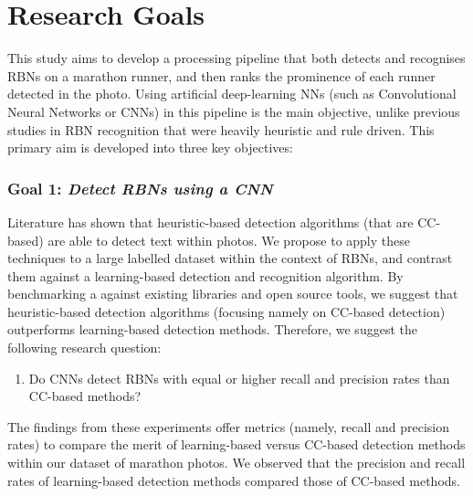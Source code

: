 \section{Research Goals}
\label{sec:research_goals}

This study aims to develop a processing pipeline that both detects and recognises RBNs on a marathon runner, and then ranks the prominence of each runner detected in the photo. Using artificial deep-learning NNs (such as Convolutional Neural Networks or CNNs) in this pipeline is the main objective, unlike previous studies in RBN recognition that were heavily heuristic and rule driven. This primary aim is developed into three key objectives:




\subsubsection*{Goal 1: \itshape Detect RBNs using a CNN}

Literature has shown that heuristic-based detection algorithms (that are CC-based) are able to detect text within photos. We propose to apply these techniques to a large labelled dataset within the context of RBNs, and contrast them against a learning-based detection and recognition algorithm. By benchmarking a against existing libraries and open source tools, we suggest that heuristic-based detection algorithms (focusing namely on CC-based detection) outperforms learning-based detection methods. 
Therefore, we suggest the following research question:
\begin{enumerate}[label=\bfseries~RQ\arabic*), leftmargin=2cm, rightmargin=1.5cm]
  \item\label{rq:1} Do CNNs detect RBNs with equal or higher recall and precision rates than CC-based methods?
\end{enumerate}
The findings from these experiments offer metrics (namely, recall and precision rates) to compare the merit of learning-based versus CC-based detection methods within our dataset of marathon photos. We observed that the precision and recall rates of learning-based detection methods compared  those of CC-based methods.

